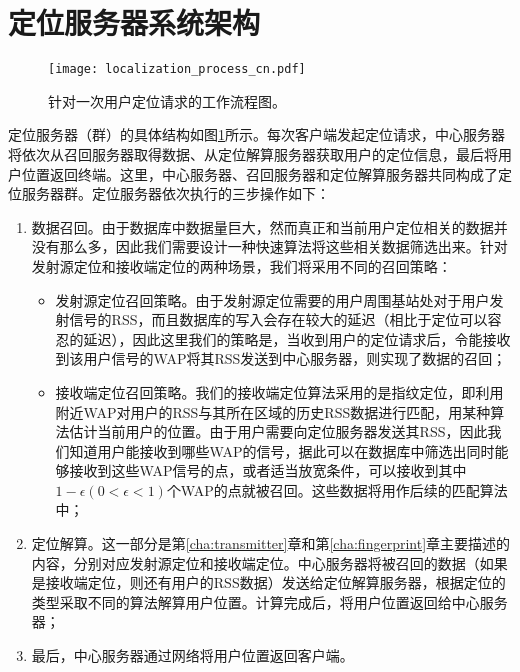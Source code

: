 \section{定位服务器系统架构} \label{sec:loc}

\begin{figure}[htb]
	\centering
	\texttt{[image: localization\_process\_cn.pdf]}
	\caption{针对一次用户定位请求的工作流程图。}
	\label{fig:loc_sys}
\end{figure}

定位服务器（群）的具体结构如图\ref{fig:loc_sys}所示。每次客户端发起定位请求，中心服务器将依次从召回服务器取得数据、从定位解算服务器获取用户的定位信息，最后将用户位置返回终端。这里，中心服务器、召回服务器和定位解算服务器共同构成了定位服务器群。定位服务器依次执行的三步操作如下：
\begin{enumerate}
	\item 数据召回。由于数据库中数据量巨大，然而真正和当前用户定位相关的数据并没有那么多，因此我们需要设计一种快速算法将这些相关数据筛选出来。针对发射源定位和接收端定位的两种场景，我们将采用不同的召回策略：
	\begin{itemize}
		\item 发射源定位召回策略。由于发射源定位需要的用户周围基站处对于用户发射信号的RSS，而且数据库的写入会存在较大的延迟（相比于定位可以容忍的延迟），因此这里我们的策略是，当收到用户的定位请求后，令能接收到该用户信号的WAP将其RSS发送到中心服务器，则实现了数据的召回；
		
		\item 接收端定位召回策略。我们的接收端定位算法采用的是指纹定位，即利用附近WAP对用户的RSS与其所在区域的历史RSS数据进行匹配，用某种算法估计当前用户的位置。由于用户需要向定位服务器发送其RSS，因此我们知道用户能接收到哪些WAP的信号，据此可以在数据库中筛选出同时能够接收到这些WAP信号的点，或者适当放宽条件，可以接收到其中$1-\epsilon (0 < \epsilon < 1)$个WAP的点就被召回。这些数据将用作后续的匹配算法中；
	\end{itemize}
	
	\item 定位解算。这一部分是第\ref{cha:transmitter}章和第\ref{cha:fingerprint}章主要描述的内容，分别对应发射源定位和接收端定位。中心服务器将被召回的数据（如果是接收端定位，则还有用户的RSS数据）发送给定位解算服务器，根据定位的类型采取不同的算法解算用户位置。计算完成后，将用户位置返回给中心服务器；
	
	\item 最后，中心服务器通过网络将用户位置返回客户端。
\end{enumerate}

